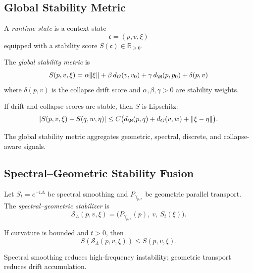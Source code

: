 \subsection{Global Stability Metric}

\begin{definition}
A \emph{runtime state} is a context state
\[
\mathfrak{c} = (p, v, \xi)
\]
equipped with a stability score $S(\mathfrak{c}) \in \mathbb{R}_{\ge 0}$.
\end{definition}

\begin{definition}
The \emph{global stability metric} is
\[
S(p,v,\xi)
= \alpha \|\xi\|
+ \beta\, d_G(v, v_0)
+ \gamma\, d_\M(p, p_0)
+ \delta(p,v)
\]
where $\delta(p,v)$ is the collapse drift score and
$\alpha,\beta,\gamma > 0$ are stability weights.
\end{definition}

\begin{lemma}
If drift and collapse scores are stable, then $S$ is Lipschitz:
\[
|S(p,v,\xi) - S(q,w,\eta)|
\le C \big( d_\M(p,q) + d_G(v,w) + \|\xi - \eta\| \big).
\]
\end{lemma}

\begin{remark}
The global stability metric aggregates geometric, spectral, discrete, and
collapse-aware signals.
\end{remark}

\subsection{Spectral--Geometric Stability Fusion}

\begin{definition}
Let $S_t = e^{-t\Delta}$ be spectral smoothing and $P_{\gamma_{p,v}}$ be
geometric parallel transport.  
The \emph{spectral--geometric stabilizer} is
\[
\mathcal{S}_{\Lambda}(p,v,\xi)
= \big( P_{\gamma_{p,v}}(p),\ v,\ S_t(\xi) \big).
\]
\end{definition}

\begin{lemma}
If curvature is bounded and $t > 0$, then
\[
S(\mathcal{S}_{\Lambda}(p,v,\xi))
\le S(p,v,\xi).
\]
\end{lemma}

\begin{remark}
Spectral smoothing reduces high-frequency instability; geometric transport
reduces drift accumulation.
\end{remark}

